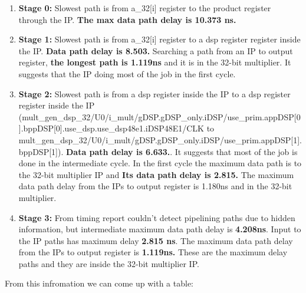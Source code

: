\documentclass{report}
\begin{document}
\begin{enumerate}
    \item \textbf{Stage 0:} Slowest path is from a\_32[i] register to the product register through the IP. \textbf{The max data path delay is 10.373 ns.}
    \item \textbf{Stage 1:} Slowest path is from a\_32[i] register to a dsp register register inside the IP. \textbf{Data path delay is 8.503.} Searching a path from an IP to output register, \textbf{the longest path is 1.119ns} and it is in the 32-bit multiplier. It suggests that the IP doing most of the job in the first cycle.
    \item \textbf{Stage 2:} Slowest path is from a dsp register inside the IP to a dsp register register inside the IP (mult\_gen\_dsp\_32/U0/i\_mult/gDSP.gDSP\_only.iDSP/use\_prim.appDSP[0].bppDSP[0].use\_dsp.use\_dsp48e1.iDSP48E1/CLK to mult\_gen\_dsp\_32/U0/i\_mult/gDSP.gDSP\_only.iDSP/use\_prim.appDSP[1].bppDSP[1]). \textbf{Data path delay is 6.633.}. It suggests that most of the job is done in the intermediate cycle. In the first cycle the maximum data path is to the 32-bit multiplier IP and \textbf{Its data path delay is 2.815.} The maximum data path delay from the IPs to output register is 1.180ns and in the 32-bit multiplier.
    \item \textbf{Stage 3:} From timing report couldn't detect pipelining paths due to hidden information, but intermediate maximum data path delay is \textbf{4.208ns}. Input to the IP paths has maximum delay \textbf{2.815 ns}. The maximum data path delay from the IPs to output register is \textbf{1.119ns.} These are the maximum delay paths and they are inside the 32-bit multiplier IP.
\end{enumerate}

From this infromation we can come up with a table:
\end{document}
